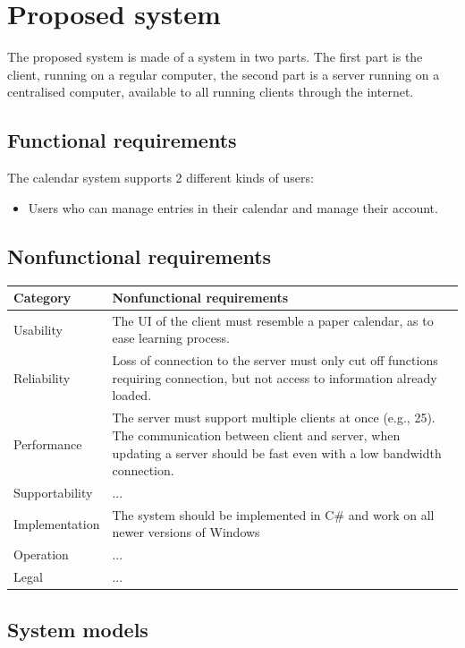 \section{Proposed system}
The proposed system is made of a system in two parts. The first part is the client, running on a regular computer, the second part is a server running on a centralised computer, available to all running clients through the internet.
\subsection{Functional requirements}
The calendar system supports 2 different kinds of users:
\begin{itemize}
\item Users who can manage entries in their calendar and manage their account.
\end{itemize}
\subsection{Nonfunctional requirements}

\begin{center}
    \begin{tabular}{ | l | p{10cm} |}
    \hline
    Category & Nonfunctional requirements \\ \hline
    Usability & The UI of the client must resemble a paper calendar, as to ease learning process.\\ \hline
    Reliability & Loss of connection to the server must only cut off functions requiring connection, but not access to information already loaded.\\ \hline
    Performance & The server must support multiple clients at once (e.g., 25).
	The communication between client and server, when updating a server should be fast even with a low bandwidth connection. \\ \hline
	Supportability & ... \\ \hline
	Implementation & The system should be implemented in C\# and work on all newer versions of Windows \\ \hline
	Operation & ... \\ \hline
	Legal & ... \\ \hline
    \end{tabular}
\end{center}
\subsection{System models}

